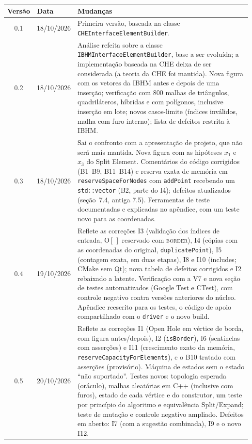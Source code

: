 \documentclass[11pt,a4paper]{article}
\newcommand{\code}[1]{\texttt{\small #1}}
\newcommand{\Op}{\mathrm{O}}
\newcommand{\BORDER}{\textsc{border}}
\begin{document}
\begin{center}\small
\begin{tabular}{clp{11.2cm}}
\toprule
Versão & Data & Mudanças\\
\midrule
0.1 & 18/10/2026 & Primeira versão, baseada na classe \code{CHEInterfaceElementBuilder}.\\
0.2 & 18/10/2026 & Análise refeita sobre a classe \code{IBHMInterfaceElementBuilder}, base a ser evoluída; a implementação
baseada na CHE deixa de ser considerada (a teoria da CHE foi mantida). Nova figura com os vetores da IBHM antes e depois
de uma inserção; verificação com 800 malhas de triângulos, quadriláteros, híbridas e com polígonos, inclusive inserção em
lote; novos casos-limite (índices inválidos, malha com furo interno); lista de defeitos restrita à IBHM.\\
0.3 & 18/10/2026 & Sai o confronto com a apresentação de projeto, que não será mais mantida. Nova figura com as
hipóteses $x_1$ e $x_3$ do Split Element. Comentários do código corrigidos (B1--B9, B11--B14) e reserva exata de memória
em \code{reserveSpaceForNodes} com \code{addPoint} recebendo um \code{std::vector} (B2, parte do I4); defeitos
atualizados (seção~7.4, antiga 7.5). Ferramentas de teste documentadas e explicadas no apêndice, com um teste novo para
as coordenadas.\\
0.4 & 19/10/2026 & Reflete as correções I3 (validação dos índices de entrada, $\Op[\,]$ reservado com \BORDER), I4 (cópias
com as coordenadas do original, \code{duplicatePoint}), I5 (contagem exata, em duas etapas), I8 e I10 (includes; CMake
sem Qt); nova tabela de defeitos corrigidos e I2 rebaixado a latente. Verificação com a V7 e nova seção de testes
automatizados (Google Test e CTest), com controle negativo contra versões anteriores do núcleo. Apêndice reescrito para
os testes, o código de apoio compartilhado com o \code{driver} e o novo build.\\
0.5 & 20/10/2026 & Reflete as correções I1 (Open Hole em vértice de borda, com figura antes/depois), I2 (\code{isBorder}),
I6 (sentinelas com asserções) e I11 (crescimento exato da memória, \code{reserveCapacityForElements}), e o B10 tratado
com asserções (provisório). Máquina de estados sem o estado ``não suportado''. Testes novos: topologia esperada
(oráculo), malhas aleatórias em C++ (inclusive com furos), estado de cada vértice e do construtor, um teste por
princípio do algoritmo e equivalência Split/Expand; teste de mutação e controle negativo ampliado. Defeitos em aberto:
I7 (com a sugestão combinada), I9 e o novo I12.\\
\bottomrule
\end{tabular}
\end{center}
\end{document}
